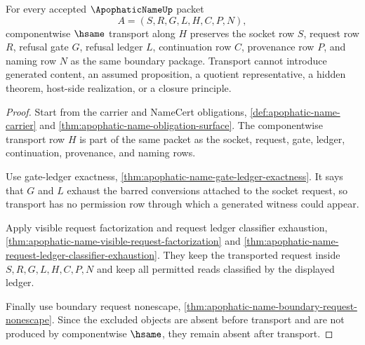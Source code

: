 \begin{theorem}
\label{thm:apophatic-name-socket-gate-componentwise-transport}
For every accepted $\ApophaticNameUp$ packet
$$
A=(S,R,G,L,H,C,P,N),
$$
componentwise $\hsame$ transport along $H$ preserves the socket row $S$, request row $R$, refusal gate $G$, refusal ledger $L$, continuation row $C$, provenance row $P$, and naming row $N$ as the same boundary package. Transport cannot introduce generated content, an assumed proposition, a quotient representative, a hidden theorem, host-side realization, or a closure principle.
\end{theorem}
\begin{proof}
Start from the carrier and NameCert obligations, \autoref{def:apophatic-name-carrier} and \autoref{thm:apophatic-name-obligation-surface}. The componentwise transport row $H$ is part of the same packet as the socket, request, gate, ledger, continuation, provenance, and naming rows.

Use gate-ledger exactness, \autoref{thm:apophatic-name-gate-ledger-exactness}. It says that $G$ and $L$ exhaust the barred conversions attached to the socket request, so transport has no permission row through which a generated witness could appear.

Apply visible request factorization and request ledger classifier exhaustion, \autoref{thm:apophatic-name-visible-request-factorization} and \autoref{thm:apophatic-name-request-ledger-classifier-exhaustion}. They keep the transported request inside $S,R,G,L,H,C,P,N$ and keep all permitted reads classified by the displayed ledger.

Finally use boundary request nonescape, \autoref{thm:apophatic-name-boundary-request-nonescape}. Since the excluded objects are absent before transport and are not produced by componentwise $\hsame$, they remain absent after transport.
\end{proof}

